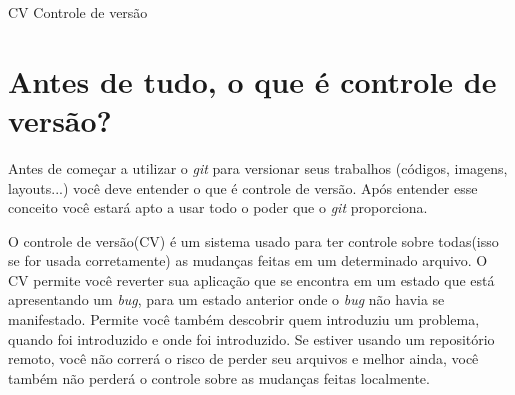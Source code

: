 \documentclass[12pt,openright,oneside,a4paper,english,brazil]{abntex2}
\renewcommand{\listtablename}{Lista de Tabelas}
\begin{document}
	\begin{siglas}
			\item[CV]	Controle de versão
	\end{siglas}
%	
%	
%	
	
	\tableofcontents*
	\cleardoublepage

\textual
	
	\chapter[Antes de tudo, o que é controle de versão?]{Antes de tudo, o que é controle de versão?} %
Antes de começar a utilizar o \textit{git} para versionar seus trabalhos (códigos, imagens, layouts...) você deve entender o que é controle de versão. Após entender esse conceito você estará apto a usar todo o poder que o \textit{git} proporciona. 

O controle de versão(CV) é um sistema usado para ter controle sobre todas(isso se for usada corretamente) as mudanças feitas em um determinado arquivo. O CV permite você reverter sua aplicação que se encontra em um estado que está apresentando um \textit{bug}, para um estado anterior onde o \textit{bug} não havia se manifestado. Permite você também descobrir quem introduziu um problema, quando foi introduzido e onde foi introduzido. Se estiver usando um repositório remoto, você não correrá o risco de perder seu arquivos e melhor ainda, você também não perderá o controle sobre as mudanças feitas localmente. 
\end{document}
